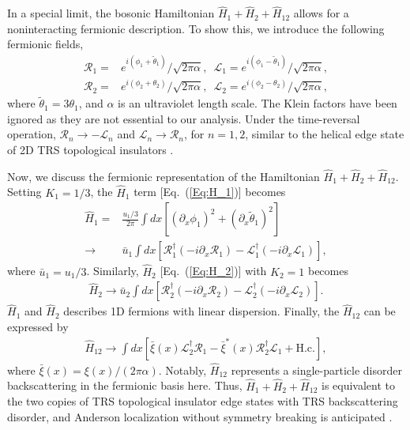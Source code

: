 \documentclass[aps,prx,amsmath,superscriptaddress,twocolumn,bibnotes,longbibliography,floatfix]{revtex4-2}
\begin{document}
	In a special limit, the bosonic Hamiltonian $\hat{H}_1+\hat{H}_2+\hat{H}_{12}$ allows for a noninteracting fermionic description. To show this, we introduce the following fermionic fields,
	\begin{align}
		\mathcal{R}_1=&e^{i(\phi_1+\tilde{\theta}_1)}/\sqrt{2\pi\alpha},\,\,\,\mathcal{L}_1=e^{i(\phi_1-\tilde{\theta}_1)}/\sqrt{2\pi\alpha},\\
		\mathcal{R}_2=&e^{i(\phi_2+\theta_2)}/\sqrt{2\pi\alpha},\,\,\,\mathcal{L}_2=e^{i(\phi_2-\theta_2)}/\sqrt{2\pi\alpha},
	\end{align}
	where $\tilde{\theta}_1=3\theta_1$, and $\alpha$ is an ultraviolet length scale. The Klein factors have been ignored as they are not essential to our analysis. Under the time-reversal operation, $\mathcal{R}_n\rightarrow-\mathcal{L}_n$ and $\mathcal{L}_n\rightarrow\mathcal{R}_n$, for $n=1,2$, similar to the helical edge state of 2D TRS topological insulators \cite{XuC2006,WuC2006,KaneCL2005a,HasanMZ2010a,QiXL2011a}.


	Now, we discuss the fermionic representation of the Hamiltonian $\hat{H}_1+\hat{H}_2+\hat{H}_{12}$. Setting $K_1=1/3$, the $\hat{H}_1$ term [Eq.~(\ref{Eq:H_1})] becomes \cite{GiamarchiT2003,GogolinAO2004,ChouYZ2023b}
	\begin{align}
		\hat{H}_1=&\frac{u_1/3}{2\pi}\int dx\left[\left(\partial_x\phi_1\right)^2+\left(\partial_x\tilde\theta_1\right)^2\right]\\
		\rightarrow &\bar{u}_1\int dx\left[\mathcal{R}_1^{\dagger}\left(-i\partial_x\mathcal{R}_1\right)-\mathcal{L}_1^{\dagger}\left(-i\partial_x\mathcal{L}_1\right)\right],
	\end{align}
	where $\bar{u}_1=u_1/3$. Similarly, $\hat{H}_2$ [Eq.~(\ref{Eq:H_2})] with $K_2=1$ becomes
	\begin{align}
		\hat{H}_2\rightarrow \bar{u}_2\int dx\left[\mathcal{R}_2^{\dagger}\left(-i\partial_x\mathcal{R}_2\right)-\mathcal{L}_2^{\dagger}\left(-i\partial_x\mathcal{L}_2\right)\right].
	\end{align}
	$\hat{H}_1$ and $\hat{H}_2$ describes 1D fermions with linear dispersion.
	Finally, the $\hat{H}_{12}$ can be expressed by
	\begin{align}
		\hat{H}_{12}\rightarrow\int dx \left[\bar\xi(x)\mathcal{L}_2^{\dagger}\mathcal{R}_1-\bar\xi^*(x)\mathcal{R}_2^{\dagger}\mathcal{L}_1+\text{H.c.}\right],
	\end{align}
	where $\bar\xi(x)=\xi(x)/(2\pi\alpha)$.
	Notably, $\hat{H}_{12}$ represents a single-particle disorder backscattering in the fermionic basis here.
	Thus, $\hat{H}_1+\hat{H}_2+\hat{H}_{12}$ is equivalent to the two copies of TRS topological insulator edge states with TRS backscattering disorder, and Anderson localization without symmetry breaking is anticipated \cite{HasanMZ2010a,QiXL2011a}.
\end{document}
